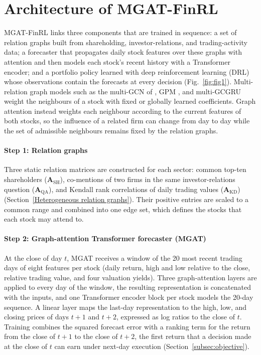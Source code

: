 \section{Architecture of MGAT-FinRL}\label{sec3}

{\color{blue}MGAT-FinRL links three components that are trained in sequence: a set of relation graphs built from shareholding, investor-relations, and trading-activity data; a forecaster that propagates daily stock features over these graphs with attention and then models each stock's recent history with a Transformer encoder; and a portfolio policy learned with deep reinforcement learning (DRL) whose observations contain the forecasts at every decision (Fig.~\ref{fig:fig1}). Multi-relation graph models such as the multi-GCN of \citep{Ye2020MultiGraph}, GPM \citep{Si2022GPM}, and multi-GCGRU \citep{Liu2021MultiGCGRU} weight the neighbours of a stock with fixed or globally learned coefficients. Graph attention \citep{Velickovic2018GAT} instead weights each neighbour according to the current features of both stocks, so the influence of a related firm can change from day to day while the set of admissible neighbours remains fixed by the relation graphs.\par}

\paragraph{Step 1: Relation graphs}
{\color{blue}Three static relation matrices are constructed for each sector: common top-ten shareholders ($\mathbf{A}_{\mathrm{SH}}$), co-mentions of two firms in the same investor-relations question ($\mathbf{A}_{\mathrm{QA}}$), and Kendall rank correlations of daily trading values ($\mathbf{A}_{\mathrm{KD}}$) (Section~\ref{Heterogeneous relation graphs}). Their positive entries are scaled to a common range and combined into one edge set, which defines the stocks that each stock may attend to.\par}

\paragraph{Step 2: Graph-attention Transformer forecaster (MGAT)}
{\color{blue}At the close of day $t$, MGAT receives a window of the 20 most recent trading days of eight features per stock (daily return, high and low relative to the close, relative trading value, and four valuation yields). Three graph-attention layers are applied to every day of the window, the resulting representation is concatenated with the inputs, and one Transformer encoder block per stock models the 20-day sequence. A linear layer maps the last-day representation to the high, low, and closing prices of days $t+1$ and $t+2$, expressed as log ratios to the close of $t$. Training combines the squared forecast error with a ranking term for the return from the close of $t+1$ to the close of $t+2$, the first return that a decision made at the close of $t$ can earn under next-day execution (Section~\ref{subsec:objective}).\par}

